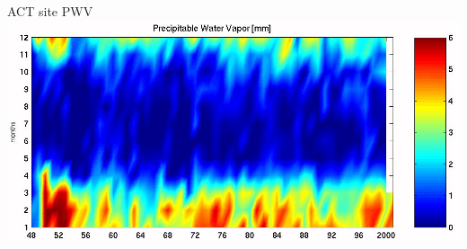 \documentclass[table]{beamer}
\begin{document}
\begin{frame}{ACT site PWV}
	\centering
	\includegraphics[width=\textwidth]{pwv_chajnantor_eso.jpeg}
\end{frame}
\end{document}
